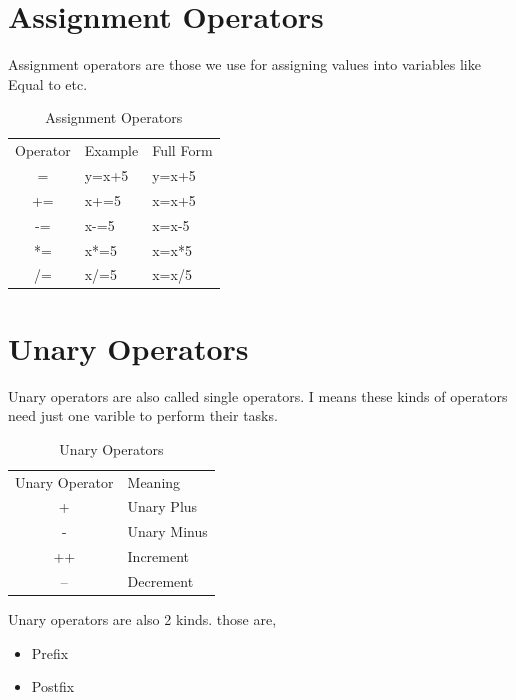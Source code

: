 \documentclass[openany]{book}  %
\begin{document}
\begin{flushleft}
    \section{Assignment Operators}
    Assignment operators\cite{Ref8} are those we use for assigning values into variables like Equal to etc.
    \begin{table}[htbp]
        \begin{tabular}{cll}
            Operator & Example & Full Form \\
            =        & y=x+5   & y=x+5     \\
            +=       & x+=5    & x=x+5     \\
            -=       & x-=5    & x=x-5     \\
            *=       & x*=5    & x=x*5     \\
            /=       & x/=5    & x=x/5
        \end{tabular}
        \centering
        \caption{Assignment Operators}
    \end{table}
    \section{Unary Operators}
    Unary operators\cite{Ref8} are also called single operators. I means these kinds of operators need just one varible to perform their tasks.
    \begin{table}[htbp]
        \begin{tabular}{cl}
            Unary Operator & Meaning     \\
            +              & Unary Plus  \\
            -              & Unary Minus \\
            ++             & Increment   \\
            --             & Decrement
        \end{tabular}
        \centering
        \caption{Unary Operators}
    \end{table}
    Unary operators are also 2 kinds. those are,
    \begin{itemize}
        \item Prefix
        \item Postfix
    \end{itemize}

\end{flushleft}
\end{document}
